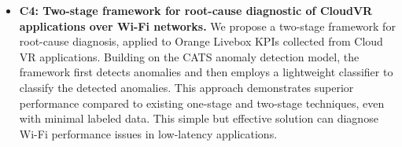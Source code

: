 \begin{itemize}
{    Joël Roman Ky, Bertrand Mathieu, Abdelkader Lahmadi and Raouf Boutaba.
    
    \textit{2024 IEEE International Conference on Big Data (BigData 2024), Washington DC, USA, December 15 - December 18 2024.} \cite{ky2024cats}

    \textbf{Code:} \url{https://github.com/joelromanky/cats}
    }

    \item \textbf{C4: Two-stage framework for root-cause diagnostic of CloudVR applications over Wi-Fi networks.} We propose a two-stage framework for root-cause diagnosis, applied to Orange Livebox KPIs collected from Cloud VR applications. Building on the CATS anomaly detection model, the framework first detects anomalies and then employs a lightweight classifier to classify the detected anomalies. This approach demonstrates superior performance compared to existing one-stage and two-stage techniques, even with minimal labeled data. This simple but effective solution can diagnose Wi-Fi performance issues in low-latency applications.


\end{itemize}

